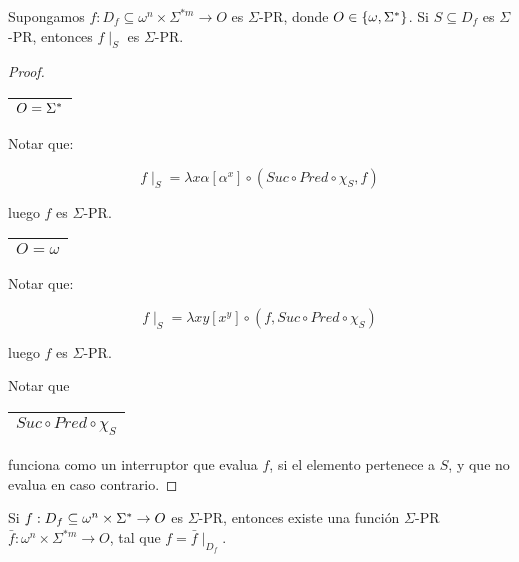   \begin{lemma}
    \par Supongamos $f: D_{f} \subseteq \omega^{n} \times \Sigma^{\ast m} \rightarrow O$ es $\Sigma$-PR, donde $O \in
    \{\omega, \Sigma^{\ast}\}$. Si $S \subseteq D_{f}$ es $\Sigma$-PR, entonces $f \mid_{S}$ es $\Sigma$-PR.
  \end{lemma}
  \begin{proof}
    \begin{tabular}{|c|} \hline $O = \Sigma^{\ast}$ \\\hline \end{tabular} Notar que:

    \[
      f \mid_{S} = \lambda x\alpha \left[\alpha^{x}\right] \circ (Suc \circ Pred \circ \chi_{S}, f)
    \]

    \par luego $f$ es $\Sigma$-PR.

    \begin{tabular}{|c|} \hline $O = \omega$ \\\hline \end{tabular} Notar que:

    \[
      f \mid_{S} = \lambda xy \left[x^{y}\right] \circ (f, Suc \circ Pred \circ \chi_{S})
    \]

    \par luego $f$ es $\Sigma$-PR.

    \vspace{3mm}
    \par Notar que \begin{tabular}{|c|} \hline $Suc \circ Pred \circ \chi_{S}$ \\\hline \end{tabular} funciona como un
    interruptor que evalua $f$, si el elemento pertenece a $S$, y que no evalua en caso contrario.
  \end{proof}

  \begin{lemma}
    \par Si $f: D_{f} \subseteq \omega^{n} \times \Sigma^{\ast} \rightarrow O$ es $\Sigma$-PR, entonces existe una función
    $\Sigma$-PR $\bar{f}: \omega^{n} \times \Sigma^{\ast m} \rightarrow O$, tal que $f = \bar{f} \mid_{D_{f}}$.
  \end{lemma}

